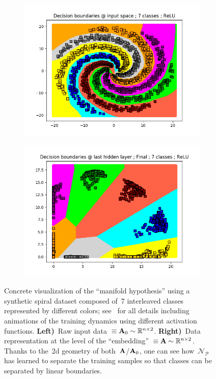 \documentclass{article}
\begin{document}
\begin{figure}
\centering
\begin{subfigure}{.5\textwidth}
  \centering
  \includegraphics[width=\linewidth]{pptx/manifoldLaurent/ReLU_inputData.png}
\end{subfigure}%
\begin{subfigure}{.5\textwidth}
  \centering
  \includegraphics[width=\linewidth]{pptx/manifoldLaurent/ReLU_decisionBoundaries_Final.png}
\end{subfigure}
\caption{Concrete visualization of the ``manifold hypothesis'' using a synthetic spiral dataset composed of~7 interleaved classes represented by different colors; see~\cite{laurentSpiral} for all details including animations of the training dynamics using different activation functions. {\bf Left)}~Raw input data~$\equiv {\bf A}_0 \sim \mathbb{R}^{n\times 2}$. {\bf Right)}~Data representation at the level of the ``embedding''~$\equiv {\bf A} \sim \mathbb{R}^{n\times 2}$. Thanks to the~2d geometry of both~${\bf A}$/${\bf A}_0$, one can see how~$\mathcal{N}_\mathcal{P}$ has learned to separate the training samples so that classes can be separated by linear boundaries.}
\label{fig::spiralNet}
\end{figure}
\end{document}
